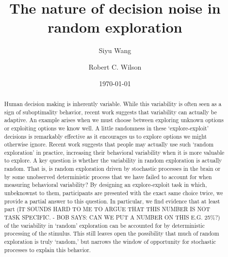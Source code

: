 \documentclass[12pt]{article}
\title{The nature of decision noise in random exploration}
\author[1]{Siyu Wang}
\author[1,2]{Robert C. Wilson}
\affil[1]{Department of Psychology, University of Arizona, Tucson AZ USA}
\affil[2]{Cognitive Science Program, University of Arizona, Tucson AZ USA}
\date{\today}
\begin{document}
	\maketitle
	
	\newpage
	\begin{abstract}
	
Human decision making is inherently variable. While this variability is often seen as a sign of suboptimality behavior, recent work suggests that variability can actually be adaptive. An example arises when we must choose between exploring unknown options or exploiting options we know well. A little randomness in these `explore-exploit' decisions is remarkably effective as it encourages us to explore options we might otherwise ignore. Recent work suggests that people may actually use such `random exploration' in practice, increasing their behavioral variability when it is more valuable to explore. 
A key question is whether the variability in random exploration is actually random. That is, is random exploration driven by stochastic processes in the brain or by some unobserved deterministic process that we have failed to account for when measuring behavioral variability? By designing an explore-exploit task in which, unbeknownst to them, participants are presented with the exact same choice twice, we provide a partial answer to this question. In particular, we find evidence that at least part (IT SOUNDS HARD TO ME TO ARGUE THAT THIS NUMBER IS NOT TASK SPECIFIC. - BOB SAYS: CAN WE PUT A NUMBER ON THIS E.G. 25\%?) of the variability in `random' exploration can be accounted for by deterministic processing of the stimulus. This still leaves open the possibility that much of random exploration is truly `random,' but narrows the window of opportunity for stochastic processes to explain this behavior.

\end{abstract}
	\newpage
\end{document}
